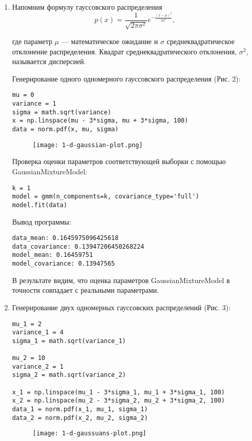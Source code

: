 \begin{enumerate}
    \item {
        Напомним формулу гауссовского распределения
        $$ p(x) = \frac{1}{\sqrt{ 2 \pi \sigma^2 }} e^{ - \frac{ (x - \mu)^2 } {2 \sigma^2} },$$

        где параметр $\mu$ --- математическое ожидание и $\sigma$ среднеквадратическое отклонение распределения. Квадрат среднеквадратического отклонения, $\sigma^2$, называется дисперсией.

        Генерирование одного одномерного гауссовского распределения (Рис. 2):
        \begin{verbatim}
mu = 0
variance = 1
sigma = math.sqrt(variance)
x = np.linspace(mu - 3*sigma, mu + 3*sigma, 100)
data = norm.pdf(x, mu, sigma)
        \end{verbatim}
        \begin{figure}[h]
            \begin{center}
                \texttt{[image: 1-d-gaussian-plot.png]}
                \caption{}
                \label{ris:experimcoded}
            \end{center}
        \end{figure}

        Проверка оценки параметров соответствующей выборки с помощью GaussianMixtureModel:
        \begin{verbatim}
k = 1
model = gmm(n_components=k, covariance_type='full')
model.fit(data)
        \end{verbatim}

        Вывод программы:
        \begin{verbatim}
data_mean: 0.1645975096425618
data_covariance: 0.13947206450268224
model_mean: 0.16459751
model_covariance: 0.13947565
        \end{verbatim}

        В результате видим, что оценка параметров GaussianMixtureModel в точности совпадает с реальными параметрами.
    }
    \item {
        Генерирование двух одномерных гауссовских распределений (Рис. 3):
        \begin{verbatim}
mu_1 = 2
variance_1 = 4
sigma_1 = math.sqrt(variance_1)

mu_2 = 10
variance_2 = 1
sigma_2 = math.sqrt(variance_2)

x_1 = np.linspace(mu_1 - 3*sigma_1, mu_1 + 3*sigma_1, 100)
x_2 = np.linspace(mu_2 - 3*sigma_2, mu_2 + 3*sigma_2, 100)
data_1 = norm.pdf(x_1, mu_1, sigma_1)
data_2 = norm.pdf(x_2, mu_2, sigma_2)
        \end{verbatim}
        \begin{figure}[h]
            \begin{center}
                \texttt{[image: 1-d-gaussuans-plot.png]}
                \caption{}
                \label{ris:experimcoded}
            \end{center}
        \end{figure}

}
\end{enumerate}
